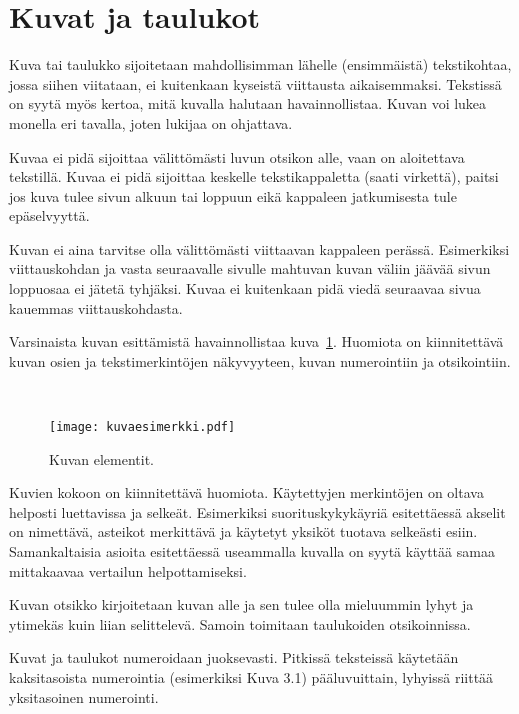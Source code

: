 \section{Kuvat ja taulukot}


Kuva tai taulukko sijoitetaan mahdollisimman lähelle
(ensimmäistä) tekstikohtaa, jossa siihen viitataan, ei kuitenkaan
kyseistä viittausta aikaisemmaksi.
Tekstissä on syytä myös kertoa, mitä kuvalla halutaan havainnollistaa.
Kuvan voi lukea monella eri tavalla, joten lukijaa on ohjattava.

Kuvaa ei pidä sijoittaa välittömästi luvun otsikon alle, vaan on
aloitettava tekstillä. Kuvaa ei pidä sijoittaa keskelle tekstikappaletta
(saati virkettä), paitsi jos kuva tulee sivun alkuun tai loppuun eikä
kappaleen jatkumisesta tule epäselvyyttä.

Kuvan ei aina tarvitse olla välittömästi viittaavan kappaleen
perässä. Esimerkiksi viittauskohdan ja
vasta seuraavalle sivulle mahtuvan kuvan väliin jäävää sivun loppuosaa
ei jätetä tyhjäksi. Kuvaa ei kuitenkaan pidä viedä seuraavaa
sivua kauemmas viittauskohdasta.


Varsinaista kuvan esittämistä havainnollistaa kuva~\ref{kuvaesimerkki}.
Huomiota on kiinnitettävä kuvan osien ja tekstimerkintöjen näkyvyyteen,
kuvan numerointiin ja otsikointiin. 

\begin{figure}[ht]
\ \newline
\begin{center}
\texttt{[image: kuvaesimerkki.pdf]}
\caption{Kuvan elementit.}
\label{kuvaesimerkki}
\end{center}
\end{figure}


Kuvien kokoon on kiinnitettävä huomiota. Käytettyjen merkintöjen
on oltava helposti luettavissa ja selkeät. Esimerkiksi
suorituskykykäyriä esitettäessä akselit on nimettävä, asteikot
merkittävä ja käytetyt yksiköt tuotava selkeästi esiin.
Samankaltaisia asioita esitettäessä useammalla kuvalla on
syytä käyttää samaa mittakaavaa vertailun helpottamiseksi.

Kuvan otsikko kirjoitetaan kuvan alle ja sen tulee olla mieluummin lyhyt
ja ytimekäs kuin liian selittelevä.
Samoin toimitaan taulukoiden otsikoinnissa.

Kuvat ja taulukot numeroidaan juoksevasti. Pitkissä teksteissä käytetään
kaksitasoista numerointia (esimerkiksi Kuva 3.1) pääluvuittain, lyhyissä
riittää yksitasoinen numerointi.


